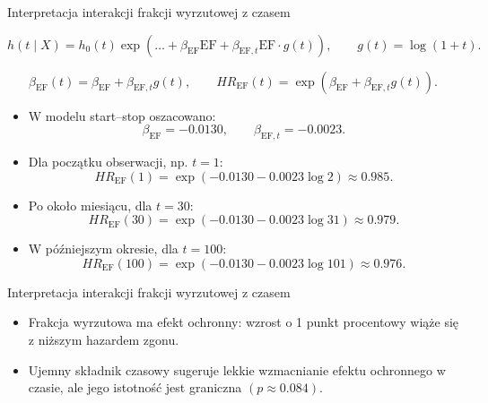\documentclass[aspectratio=169]{beamer}
\begin{document}
\begin{frame}{Interpretacja interakcji frakcji wyrzutowej z czasem}
\small

\[
h(t\mid X)=h_0(t)\exp\left(
\ldots+\beta_{\mathrm{EF}}\mathrm{EF}
+\beta_{\mathrm{EF},t}\mathrm{EF}\cdot g(t)
\right),
\qquad g(t)=\log(1+t).
\]

\[
\beta_{\mathrm{EF}}(t)
=
\beta_{\mathrm{EF}}
+
\beta_{\mathrm{EF},t}g(t),
\qquad
HR_{\mathrm{EF}}(t)
=
\exp\left(\beta_{\mathrm{EF}}+\beta_{\mathrm{EF},t}g(t)\right).
\]

\begin{itemize}
    \item W modelu start--stop oszacowano:
    \[
    \beta_{\mathrm{EF}}=-0.0130,
    \qquad
    \beta_{\mathrm{EF},t}=-0.0023.
    \]

    \item Dla początku obserwacji, np. \(t=1\):
    \[
    HR_{\mathrm{EF}}(1)
    =
    \exp(-0.0130-0.0023\log 2)
    \approx 0.985.
    \]

    \item Po około miesiącu, dla \(t=30\):
    \[
    HR_{\mathrm{EF}}(30)
    =
    \exp(-0.0130-0.0023\log 31)
    \approx 0.979.
    \]

    \item W późniejszym okresie, dla \(t=100\):
    \[
    HR_{\mathrm{EF}}(100)
    =
    \exp(-0.0130-0.0023\log 101)
    \approx 0.976.
    \]

\end{itemize}

\end{frame}


\begin{frame}{Interpretacja interakcji frakcji wyrzutowej z czasem}

\begin{itemize}
    \item Frakcja wyrzutowa ma efekt ochronny: wzrost o 1 punkt procentowy wiąże się z niższym hazardem zgonu.
    \item Ujemny składnik czasowy sugeruje lekkie wzmacnianie efektu ochronnego w czasie, ale jego istotność jest graniczna \((p\approx 0.084)\).
    \end{itemize}

\end{frame}
\end{document}
